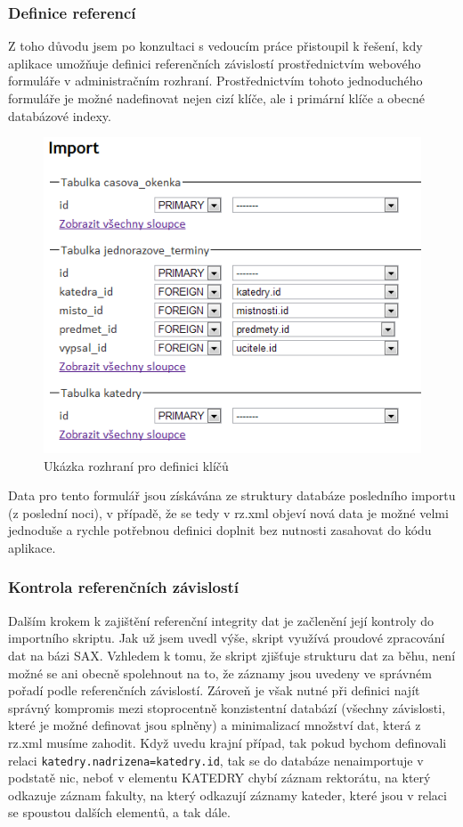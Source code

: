 \documentclass[11pt,twoside,a4paper]{book}
\begin{document}
\subsubsection{Definice referencí} \label{defref}
Z toho důvodu jsem po konzultaci s vedoucím práce přistoupil k řešení, kdy aplikace umožňuje definici referenčních závislostí prostřednictvím webového formuláře v administračním rozhraní. Prostřednictvím tohoto jednoduchého formuláře je možné nadefinovat nejen cizí klíče, ale i primární klíče a obecné databázové indexy.

\begin{figure}[h]
\begin{center}
\includegraphics[scale=0.6]{figures/import_setup.png}
\caption{Ukázka rozhraní pro definici klíčů}
\label{fig:importSetup}
\end{center}
\end{figure}

Data pro tento formulář jsou získávána ze struktury databáze posledního importu (z poslední noci), v případě, že se tedy v rz.xml objeví nová data je možné velmi jednoduše a rychle potřebnou definici doplnit bez nutnosti zasahovat do kódu aplikace.

\subsubsection{Kontrola referenčních závislostí}
Dalším krokem k zajištění referenční integrity dat je začlenění její kontroly do importního skriptu. Jak už jsem uvedl výše, skript využívá proudové zpracování dat na bázi SAX.
Vzhledem k tomu, že skript zjišťuje strukturu dat za běhu, není možné se ani obecně spolehnout na to, že záznamy jsou uvedeny ve správném pořadí podle referenčních závislostí. Zároveň je však nutné při definici najít správný kompromis mezi stoprocentně konzistentní databází (všechny závislosti, které je možné definovat jsou splněny) a minimalizací množství dat, která z rz.xml musíme zahodit. Když uvedu krajní případ, tak pokud bychom definovali relaci \texttt{katedry.nadrizena=katedry.id}, tak se do databáze nenaimportuje v podstatě nic, neboť v elementu KATEDRY chybí záznam rektorátu, na který odkazuje záznam fakulty, na který odkazují záznamy kateder, které jsou v relaci se spoustou dalších elementů, a tak dále. 
\end{document}
